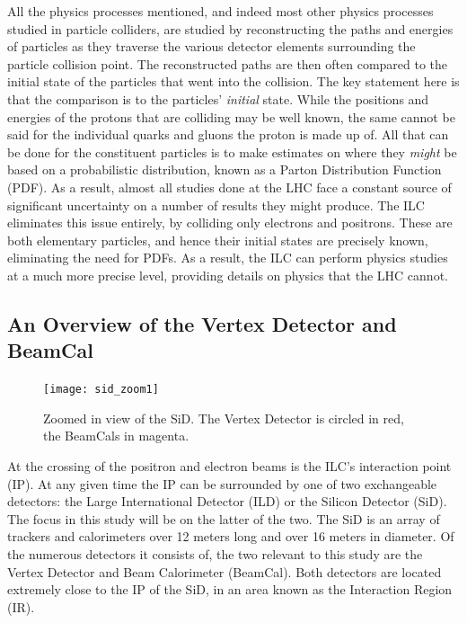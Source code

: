 \documentclass{report}
\begin{document}
                All the physics processes mentioned, and indeed most other physics processes studied in particle colliders, are studied by reconstructing the paths and energies of particles as they traverse the various detector elements surrounding the particle collision point. The reconstructed paths are then often compared to the initial state of the particles that went into the collision. The key statement here is that the comparison is to the particles' \textit{initial} state. While the positions and energies of the protons that are colliding may be well known, the same cannot be said for the individual quarks and gluons the proton is made up of. All that can be done for the constituent particles is to make estimates on where they \textit{might} be based on a probabilistic distribution, known as a Parton Distribution Function (PDF). As a result, almost all studies done at the LHC face a constant source of significant uncertainty on a number of results they might produce. The ILC eliminates this issue entirely, by colliding only electrons and positrons. These are both elementary particles, and hence their initial states are precisely known, eliminating the need for PDFs. As a result, the ILC can perform physics studies at a much more precise level, providing details on physics that the LHC cannot.

            \subsection{An Overview of the Vertex Detector and BeamCal}
                \begin{figure}[h] 
                    \texttt{[image: sid\_zoom1]}
                    \centering
                    \caption{Zoomed in view of the SiD.
                        The Vertex Detector is circled in red,
                        the BeamCals in magenta.}
                    \label{fig__sid_zoom1}
                \end{figure}

                At the crossing of the positron and electron beams is the ILC's interaction point (IP). At any given time the IP can be surrounded by one of two exchangeable detectors: the Large International Detector (ILD) or the Silicon Detector (SiD). The focus in this study will be on the latter of the two. The SiD is an array of trackers and calorimeters over 12 meters long and over 16 meters in diameter. Of the numerous detectors it consists of, the two relevant to this study are the Vertex Detector and Beam Calorimeter (BeamCal). Both detectors are located extremely close to the IP of the SiD, in an area known as the Interaction Region (IR). 
\end{document}
